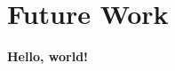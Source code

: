 \documentclass[../main.tex]{subfiles}
\begin{document}
    
\chapter{Future Work}
    
\textbf{Hello, world!}
\end{document}
